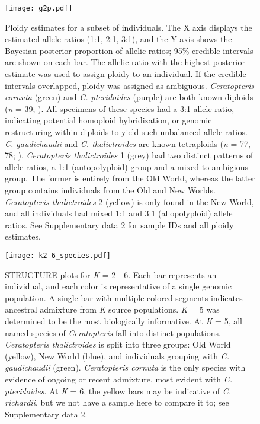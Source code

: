 \documentclass[12pt]{article}
\begin{document}
\begin{figure}[H]
\centering
\texttt{[image: g2p.pdf]}
\caption{Ploidy estimates for a subset of individuals. The X axis displays the estimated allele ratios (1:1, 2:1, 3:1), and the Y axis shows the Bayesian posterior proportion of allelic ratios; 95\% credible intervals are shown on each bar. The allelic ratio with the highest posterior estimate was used to assign ploidy to an individual. If the credible intervals overlapped, ploidy was assigned as ambiguous. \textit{Ceratopteris cornuta} (green) and \textit{C. pteridoides} (purple) are both known diploids (\textit{n} = 39; \cite{Hickok1977}). All specimens of these species had a 3:1 allele ratio, indicating potential homoploid hybridization, or genomic restructuring within diploids to yield such unbalanced allele ratios. \textit{C. gaudichaudii} and \textit{C. thalictroides} are known tetraploids (\textit{n} = 77, 78; \cite{Masuyama2010}). \textit{Ceratopteris thalictroides} 1 (grey) had two distinct patterns of allele ratios, a 1:1 (autopolyploid) group and a mixed to ambigious group. The former is entirely from the Old World, whereas the latter group contains individuals from the Old and New Worlds. \textit{Ceratopteris thalictroides} 2 (yellow) is only found in the New World, and all individuals had mixed 1:1 and 3:1 (allopolyploid) allele ratios. See Supplementary data 2 for sample IDs and all ploidy estimates.}
\label{g2p}
\end{figure}

\begin{figure}[H]
\centering
\texttt{[image: k2-6\_species.pdf]}
\caption{{\small{STRUCTURE}} plots for \textit{K} = 2 - 6. Each bar represents an individual, and each color is representative of a single genomic population. A single bar with multiple colored segments indicates ancestral admixture from \textit{K} source populations. \textit{K} = 5 was determined to be the most biologically informative. At \textit{K} = 5, all named species of \textit{Ceratopteris} fall into distinct populations. \textit{Ceratopteris thalictroides} is split into three groups: Old World (yellow), New World (blue), and individuals grouping with \textit{C. gaudichaudii} (green). \textit{Ceratopteris cornuta} is the only species with evidence of ongoing or recent admixture, most evident with \textit{C. pteridoides}. At \textit{K} = 6, the yellow bars may be indicative of \textit{C. richardii}, but we not have a sample here to compare it to; see Supplementary data 2.}
\label{structure}
\end{figure}
\end{document}
